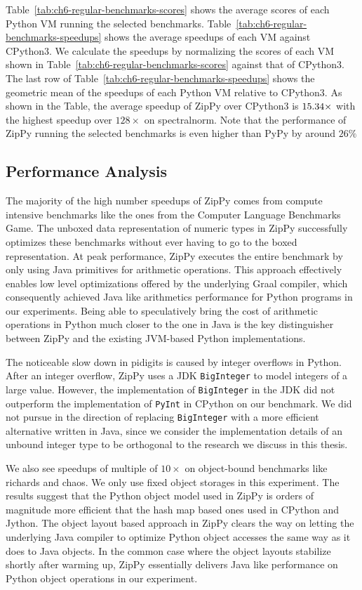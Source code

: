 Table~\ref{tab:ch6-regular-benchmarks-scores} shows the average scores of each Python VM running the selected benchmarks.
Table~\ref{tab:ch6-regular-benchmarks-speedups} shows the average speedups of each VM against CPython3.
We calculate the speedups by normalizing the scores of each VM shown in Table~\ref{tab:ch6-regular-benchmarks-scores} against that of CPython3.
The last row of Table~\ref{tab:ch6-regular-benchmarks-speedups} shows the geometric mean of the speedups of each Python VM relative to CPython3.
As shown in the Table, the average speedup of ZipPy over CPython3 is $15.34{}\times$ with the highest speedup over $128\times$ on \textsf{spectralnorm}.
Note that the performance of ZipPy running the selected benchmarks is even higher than PyPy by around $26\%$

\subsection{Performance Analysis}

The majority of the high number speedups of ZipPy comes from compute intensive benchmarks like the ones from the Computer Language Benchmarks Game.
The unboxed data representation of numeric types in ZipPy successfully optimizes these benchmarks without ever having to go to the boxed representation.
At peak performance, ZipPy executes the entire benchmark by only using Java primitives for arithmetic operations.
This approach effectively enables low level optimizations offered by the underlying Graal compiler, which consequently achieved Java like arithmetics performance for Python programs in our experiments.
Being able to speculatively bring the cost of arithmetic operations in Python much closer to the one in Java is the key distinguisher between ZipPy and the existing JVM-based Python implementations.

The noticeable slow down in \textsf{pidigits} is caused by integer overflows in Python.
After an integer overflow, ZipPy uses a JDK \texttt{BigInteger}  to model integers of a large value.
However, the implementation of \texttt{BigInteger} in the JDK did not outperform the implementation of \texttt{PyInt} in CPython on our benchmark.
We did not pursue in the direction of replacing \texttt{BigInteger} with a more efficient alternative written in Java, since we consider the implementation details of an unbound integer type to be orthogonal to the research we discuss in this thesis.

We also see speedups of multiple of $10\times$ on object-bound benchmarks like \textsf{richards} and \textsf{chaos}.
We only use fixed object storages in this experiment.
The results suggest that the Python object model used in ZipPy is orders of magnitude more efficient that the hash map based ones used in CPython and Jython.
The object layout based approach in ZipPy clears the way on letting the underlying Java compiler to optimize Python object accesses the same way as it does to Java objects.
In the common case where the object layouts stabilize shortly after warming up, ZipPy essentially delivers Java like performance on Python object operations in our experiment.

